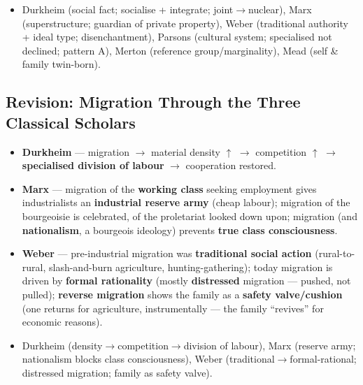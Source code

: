 \begin{QuickRevision}
\begin{itemize}
\item Durkheim (social fact; socialise + integrate; joint$\rightarrow$nuclear), Marx (superstructure; guardian of private property), Weber (traditional authority + ideal type; disenchantment), Parsons (cultural system; specialised not declined; pattern A), Merton (reference group/marginality), Mead (self \& family twin-born).
\end{itemize}
\end{QuickRevision}

\sectiondivider

\subsection{Revision: Migration Through the Three Classical Scholars}

\begin{DataFact}
\begin{itemize}
\item \textbf{Durkheim} --- migration $\rightarrow$ material density $\uparrow$ $\rightarrow$ competition $\uparrow$ $\rightarrow$ \textbf{specialised division of labour} $\rightarrow$ cooperation restored.
\item \textbf{Marx} --- migration of the \textbf{working class} seeking employment gives industrialists an \textbf{industrial reserve army} (cheap labour); migration of the bourgeoisie is celebrated, of the proletariat looked down upon; migration (and \textbf{nationalism}, a bourgeois ideology) prevents \textbf{true class consciousness}.
\item \textbf{Weber} --- pre-industrial migration was \textbf{traditional social action} (rural-to-rural, slash-and-burn agriculture, hunting-gathering); today migration is driven by \textbf{formal rationality} (mostly \textbf{distressed} migration --- pushed, not pulled); \textbf{reverse migration} shows the family as a \textbf{safety valve/cushion} (one returns for agriculture, instrumentally --- the family ``revives'' for economic reasons).
\end{itemize}
\end{DataFact}

\begin{QuickRevision}
\begin{itemize}
\item Durkheim (density$\rightarrow$competition$\rightarrow$division of labour), Marx (reserve army; nationalism blocks class consciousness), Weber (traditional$\rightarrow$formal-rational; distressed migration; family as safety valve).
\end{itemize}
\end{QuickRevision}

